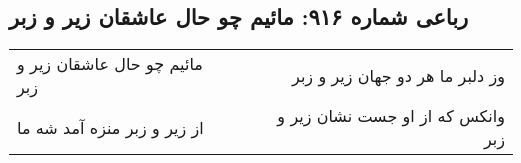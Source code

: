\begin{center}
\section*{رباعی شماره ۹۱۶: مائیم چو حال عاشقان زیر و زبر}
\label{sec:0916}
\begin{longtable}{l p{0.5cm} r}
مائیم چو حال عاشقان زیر و زبر
&&
وز دلبر ما هر دو جهان زیر و زبر
\\
از زیر و زبر منزه آمد شه ما
&&
وانکس که از او جست نشان زیر و زبر
\\
\end{longtable}
\end{center}
